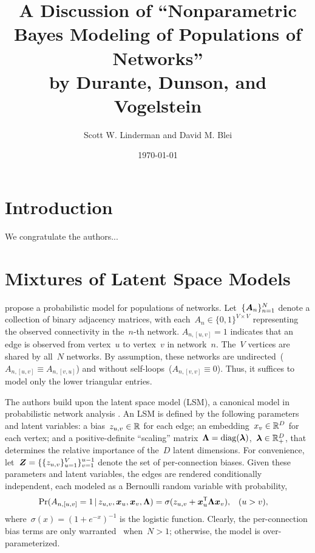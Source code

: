 



\title{A Discussion of ``Nonparametric Bayes Modeling of Populations of Networks''\\
by Durante, Dunson, and Vogelstein}
\author{Scott W. Linderman and David M. Blei}
\date{\today}


\maketitle

\begin{abstract}

\end{abstract}

\section{Introduction}

We congratulate the authors...

\section{Mixtures of Latent Space Models}
\citet{durante2016nonparametric} propose a probabilistic model for
populations of networks.  Let~$\{\boldsymbol{A}_n\}_{n=1}^N$ denote a collection
of binary adjacency matrices, with
each~${A_n \in \{0,1\}^{V \times V}}$ representing the observed
connectivity in the~$n$-th network.  ${A_{n,[u,v]}=1}$ indicates that
an edge is observed from vertex~$u$ to vertex~$v$ in
network~$n$.
The~$V$ vertices are shared by all~$N$ networks.
By assumption, these networks are undirected~(${A_{n,[u,v]} \equiv A_{n,[v,u]}}$)
and without self-loops~(${A_{n,[v,v]} \equiv 0}$). Thus, it suffices to model only
the lower triangular entries.

The authors build upon the latent space model (LSM), a canonical model
in probabilistic network analysis \citep{hoff2002latent,
  hoff2008modeling}. An LSM is defined by the following parameters and
latent variables: a bias~${z_{u,v} \in \mathbb{R}}$ for each edge; an
embedding~${x_v \in \mathbb{R}^D}$ for each vertex; and a
positive-definite ``scaling''
matrix~${\boldsymbol{\Lambda} = \operatorname{diag}(\boldsymbol{\lambda})}$,~$\boldsymbol{\lambda} \in \mathbb{R}_+^D$, that
determines the relative importance of the~$D$ latent dimensions.  For
convenience, let~${\boldsymbol{Z} = \{\{z_{u,v}\}_{u=1}^V\}_{v=1}^{u-1}}$ denote
the set of per-connection biases.  Given these parameters and latent
variables, the edges are rendered conditionally independent, each
modeled as a Bernoulli random variable with probability,
\begin{align}
  \Pr(A_{n,[u,v]}=1 \, | \, z_{u,v}, \boldsymbol{x}_u, \boldsymbol{x}_v, \boldsymbol{\Lambda})
  &= \sigma(z_{u,v} + \boldsymbol{x}_u^{\mathsf{T}} \boldsymbol{\Lambda} \boldsymbol{x}_v),
  & (u &> v),
\end{align}
where~${\sigma(x) = (1+e^{-x})^{-1}}$ is the logistic function.
Clearly, the per-connection bias terms are only warranted
~when~${N > 1}$; otherwise, the model is over-parameterized.

